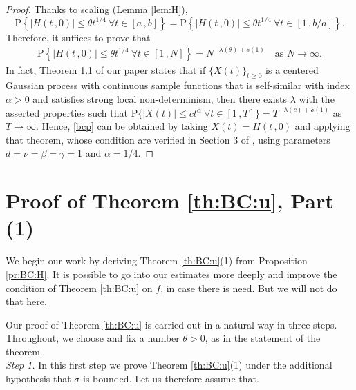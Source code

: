 \documentclass[reqno]{amsart}
\newcommand{\<}{\langle}
\renewcommand{\>}{\rangle}
\renewcommand{\P}{\mathrm{P}}
\newcommand{\1}{\mathbb{1}}
\renewcommand{\ge}{\geqslant}
\renewcommand{\le}{\leqslant}
\theoremstyle{definition}
\numberwithin{equation}{section}
\begin{document}
\begin{proof}
	Thanks to scaling (Lemma \ref{lem:H}),
	\[ 
		\P\left\{  | H(t\,,0)| \le \theta t^{1/4}\ \forall t\in[a\,,b]\right\}
		=  \P\left\{  | H(t\,,0)| \le \theta t^{1/4}\
		\forall t\in[1\,,b/a]\right\}.
	\]
	Therefore, it suffices to prove that
	\begin{align}\label{bcp}
		\P\left\{  | H(t\,,0)| \le \theta t^{1/4}\
		\forall t\in[1\,,N]\right\}
		= N^{-\lambda(\theta)+\mathscr{o}(1)}\quad\text{as $N\to\infty$}.
	\end{align}
	In fact, Theorem 1.1 of our paper \cite{KL} states that if 
	$\{X(t)\}_{t \ge 0}$ is a centered Gaussian process with continuous 
	sample functions that is self-similar with index $\alpha>0$ and 
	satisfies strong local non-determinism, then there exists $\lambda$ 
	with the asserted properties such that 
	$\P\{ |X(t)| \le c t^\alpha \ \forall t \in [1\,,T] \} = 
	T^{-\lambda(c)+\mathscr{o}(1)}$ as $T \to \infty$.
	Hence, \eqref{bcp} can be obtained by taking $X(t) = H(t\,,0)$ 
	and applying that theorem, whose condition are verified in Section 3 of \cite{KL},
	using parameters $d=\nu=\beta=\gamma=1$ and $\alpha=1/4$.
\end{proof}


\section{Proof of Theorem \ref{th:BC:u}, Part (1)}

We begin our work by deriving Theorem \ref{th:BC:u}(1)
from Proposition \ref{pr:BC:H}. It is possible to go into 
our estimates more deeply and improve the condition of
Theorem \ref{th:BC:u} on $f$, in case there is need. 
But we will not do that here. 

Our proof of Theorem \ref{th:BC:u} is carried out in a natural way
in three steps. Throughout, we choose and fix a number 
$\theta>0$, as in the statement of the theorem.\\

\noindent\emph{Step 1.} In this first step we prove Theorem \ref{th:BC:u}(1)
under the additional hypothesis that $\sigma$ is bounded. Let us therefore
assume that. 
\end{document}
